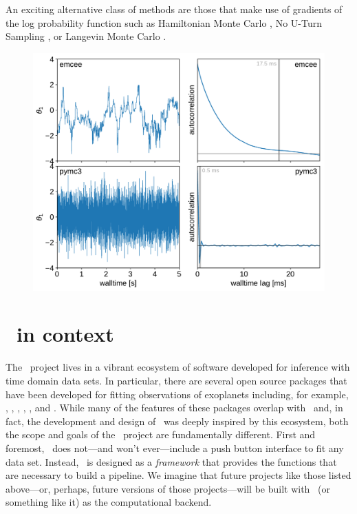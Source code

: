 \documentclass[modern]{aastex62}
\begin{document}
An exciting alternative class of methods are those that make use of gradients of the log probability function such as Hamiltonian Monte Carlo \citep[HMC,][]{Neal:2011, Betancourt:2017}, No U-Turn Sampling \citep[NUTS,][]{Hoffman:2014}, or Langevin Monte Carlo \citep[LMC,][]{Girolami:2011}.

\begin{figure}[htbp]
\begin{centering}
\includegraphics[width=0.8\linewidth]{figures/gaussians.pdf}
\end{centering}
\end{figure}

\section{\exoplanet\ in context}

The \exoplanet\ project lives in a vibrant ecosystem of software developed for inference with time domain data sets.
In particular, there are several open source packages that have been developed for fitting observations of exoplanets including, for example,  \citep{Eastman:2019},  \citep{Espinoza:2019},  \citep{Gunther:2019},  \citep{Trifonov:2019},  \citep{Barragan:2019}, and  \citep{Fulton:2018}.
While many of the features of these packages overlap with \exoplanet\ and, in fact, the development and design of \exoplanet\ was deeply inspired by this ecosystem, both the scope and goals of the \exoplanet\ project are fundamentally different.
First and foremost, \exoplanet\ does not---and won't ever---include a push button interface to fit any data set.
Instead, \exoplanet\ is designed as a \emph{framework} that provides the functions that are necessary to build a pipeline.
We imagine that future projects like those listed above---or, perhaps, future versions of those projects---will be built with \exoplanet\ (or something like it) as the computational backend.
\end{document}

